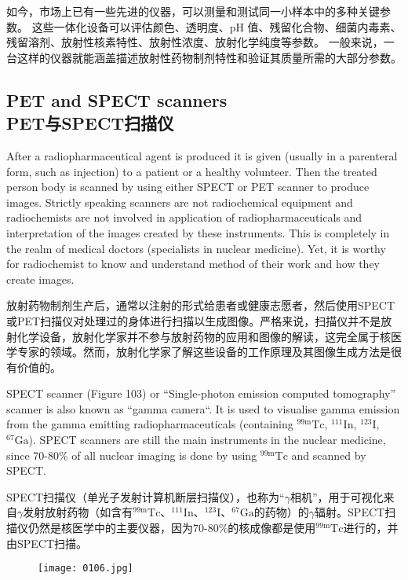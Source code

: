 \documentclass[dvipsnames, svgnames,a4paper,11pt]{article}
\begin{document}
如今，市场上已有一些先进的仪器，可以测量和测试同一小样本中的多种关键参数。 这些一体化设备可以评估颜色、透明度、pH 值、残留化合物、细菌内毒素、残留溶剂、放射性核素特性、放射性浓度、放射化学纯度等参数。 一般来说，一台这样的仪器就能涵盖描述放射性药物制剂特性和验证其质量所需的大部分参数。

\subsection{PET and SPECT scanners \\PET与SPECT扫描仪}

After a radiopharmaceutical agent is produced it is given (usually in a parenteral form,
such as injection) to a patient or a healthy volunteer. Then the treated person body is
scanned by using either SPECT or PET scanner to produce images. Strictly
speaking scanners are not radiochemical equipment and radiochemists are not
involved in application of radiopharmaceuticals and interpretation of the images
created by these instruments. This is completely in the realm of medical doctors
(specialists in nuclear medicine). Yet, it is worthy for radiochemist to know and
understand method of their work and how they create images.

放射药物制剂生产后，通常以注射的形式给患者或健康志愿者，然后使用SPECT或PET扫描仪对处理过的身体进行扫描以生成图像。严格来说，扫描仪并不是放射化学设备，放射化学家并不参与放射药物的应用和图像的解读，这完全属于核医学专家的领域。然而，放射化学家了解这些设备的工作原理及其图像生成方法是很有价值的。

SPECT scanner (Figure 103) or “Single-photon emission computed tomography”
scanner is also known as “gamma camera“. It is used to visualise gamma emission
from the gamma emitting radiopharmaceuticals (containing ${}^\mathrm{99m}\mathrm{Tc}$, ${}^{111}\mathrm{In}$, ${}^{123}\mathrm{I}$, ${}^{67}\mathrm{Ga}$).
SPECT scanners are still the main instruments in the nuclear medicine, since 70-80\%
of all nuclear imaging is done by using ${}^\mathrm{99m}\mathrm{Tc}$ and scanned by SPECT.

SPECT扫描仪（单光子发射计算机断层扫描仪），也称为“$\gamma$相机”，用于可视化来自$\gamma$发射放射药物（如含有${}^\mathrm{99m}\mathrm{Tc}$、${}^{111}\mathrm{In}$、${}^{123}\mathrm{I}$、${}^{67}\mathrm{Ga}$的药物）的$\gamma$辐射。SPECT扫描仪仍然是核医学中的主要仪器，因为70-80\%的核成像都是使用${}^\mathrm{99m}\mathrm{Tc}$进行的，并由SPECT扫描。

\begin{figure}[h]
    \centering
    \texttt{[image: 0106.jpg]}
     \label{fig103}
\end{figure}
\end{document}
